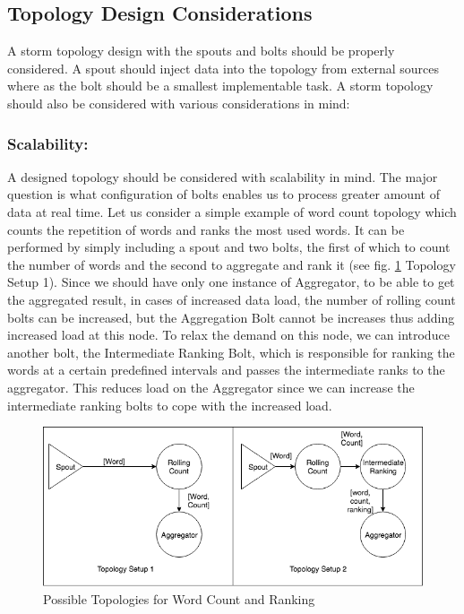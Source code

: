 \documentclass[runningheads,a4paper]{llncs}[2015/06/24]
\begin{document}
\subsection{Topology Design Considerations}
A storm topology design with the spouts and bolts should be properly considered. A spout should inject data into the topology from external sources where as the bolt should be a smallest implementable task. A storm topology should also be considered with various considerations in mind:

\subsubsection{Scalability:} A designed topology should be considered with scalability in mind. The major question is what configuration of bolts enables us to process greater amount of data at real time. Let us consider a simple example of word count topology which counts the repetition of words and ranks the most used words. It can be performed by simply including a spout and two bolts, the first of which to count the number of words and the second to aggregate and rank it (see fig. \ref{fig:ranking} Topology Setup 1).
Since we should have only one instance of Aggregator, to be able to get the aggregated result, in cases of increased data load, the number of rolling count bolts can be increased, but the Aggregation Bolt cannot be increases thus adding increased load at this node. To relax the demand on this node, we can introduce another bolt, the Intermediate Ranking Bolt, which is responsible for ranking the words at a certain predefined intervals and passes the intermediate ranks to the aggregator. This reduces load on the Aggregator since we can increase the intermediate ranking bolts to cope with the increased load.

\begin{figure}
  \begin{center}
    \includegraphics[width=\textwidth]{ranking.png}
    \caption{Possible Topologies for Word Count and Ranking}
    \label{fig:ranking}
   \end{center}
\end{figure}
\end{document}
